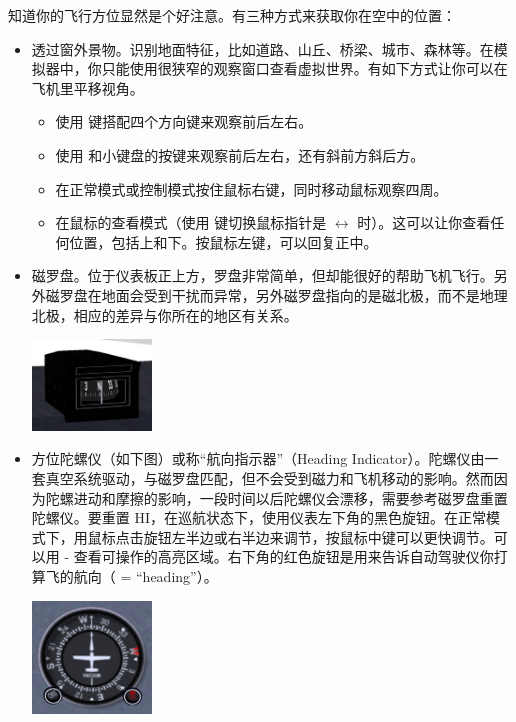 知道你的飞行方位显然是个好注意。有三种方式来获取你在空中的位置：
\begin{itemize}
    \item 透过窗外景物。识别地面特征，比如道路、山丘、桥梁、城市、森林等。在模拟器中，你只能使用很狭窄的观察窗口查看虚拟世界。有如下方式让你可以在飞机里平移视角。
    \begin{itemize}
        \item 使用  键搭配四个方向键来观察前后左右。
        \item 使用  和小键盘的按键来观察前后左右，还有斜前方斜后方。
        \item 在正常模式或控制模式按住鼠标右键，同时移动鼠标观察四周。
        \item 在鼠标的查看模式（使用  键切换鼠标指针是 $\leftrightarrow$ 时）。这可以让你查看任何位置，包括上和下。按鼠标左键，可以回复正中。
\end{itemize}
\item 磁罗盘。位于仪表板正上方，罗盘非常简单，但却能很好的帮助飞机飞行。另外磁罗盘在地面会受到干扰而异常，另外磁罗盘指向的是磁北极，而不是地理北极，相应的差异与你所在的地区有关系。

\begin{center}
\includegraphics[width=0.25\textwidth]{img/tut_36}
\end{center}

\item 方位陀螺仪（如下图）或称“航向指示器”（Heading Indicator）。陀螺仪由一套真空系统驱动，与磁罗盘匹配，但不会受到磁力和飞机移动的影响。然而因为陀螺进动和摩擦的影响，一段时间以后陀螺仪会漂移，需要参考磁罗盘重置陀螺仪。要重置 HI，在巡航状态下，使用仪表左下角的黑色旋钮。在正常模式下，用鼠标点击旋钮左半边或右半边来调节，按鼠标中键可以更快调节。可以用 - 查看可操作的高亮区域。右下角的红色旋钮是用来告诉自动驾驶仪你打算飞的航向（\textcolor{red}{} = ``heading''）。

\begin{center}
\includegraphics[width=0.25\textwidth]{img/tut_37}
\end{center}
\end{itemize}

